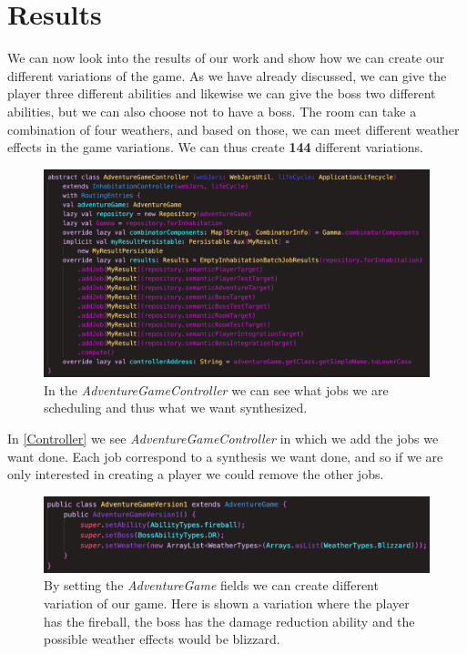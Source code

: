 \section{Results}
We can now look into the results of our work and show how we can create our different variations of the game. As we have already discussed, we can give the player three different abilities and likewise we can give the boss two different abilities, but we can also choose not to have a boss. The room can take a combination of four weathers, and based on those, we can meet different weather effects in the game variations. We can thus create \textbf{144} different variations.

\begin{figure}[H]
	\centering
	\includegraphics[width=\linewidth]{Materials/Results/AdventureController}
	\caption{In the \textit{AdventureGameController} we can see what jobs we are scheduling and thus what we want synthesized.}
	\label{Controller}
\end{figure}
In \autoref{Controller} we see \textit{AdventureGameController} in which we add the jobs we want done. Each job correspond to a synthesis we want done, and so if we are only interested in creating a player we could remove the other jobs.

\begin{figure}[H]
	\centering
	\includegraphics[width=\linewidth]{Materials/Results/AdventureVariation}
	\caption{By setting the \textit{AdventureGame} fields we can create different variation of our game. Here is shown a variation where the player has the fireball, the boss has the damage reduction ability and the possible weather effects would be blizzard.}
	\label{version1}
\end{figure}

